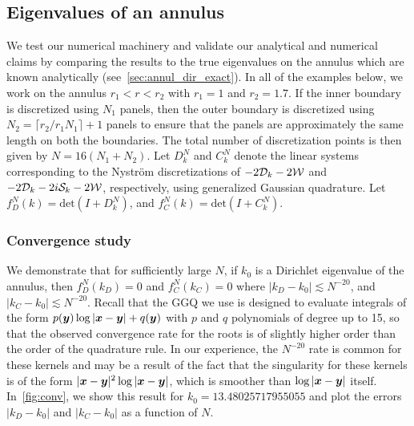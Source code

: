 \subsection{Eigenvalues of an annulus}
We test our numerical machinery and validate our analytical 
and numerical claims
by comparing the results to the true eigenvalues on the annulus
which are known analytically (see~\cref{sec:annul_dir_exact}).
In all of the examples below, we work on the annulus $r_{1}<r<r_{2}$
with $r_{1} = 1$ and $r_{2} = 1.7$.
If the inner boundary is discretized using $N_{1}$ panels, 
then the outer boundary is discretized using $N_{2} = 
\lceil r_{2}/r_{1} N_{1} \rceil +1$ panels to ensure that the
panels are approximately the same length on both the boundaries. 
The total number of discretization points 
is then given by $N = 16(N_{1} + N_{2})$.
{\color{red}Let $D^{N}_{k}$ and $C^{N}_{k}$ denote the linear
  systems corresponding to the Nystr\"{o}m discretizations of
  $-2{\mathcal D}_{k} -2{\mathcal W}$ and $-2{\mathcal D}_{k} - 2i{\mathcal S}_{k} -2{\mathcal W}$,
  respectively, using generalized Gaussian quadrature.}
Let $f_{D}^{N}(k) = \text{det}(I+D^{N}_{k})$, and 
$f_{C}^{N}(k) = \text{det}(I+C^{N}_{k})$.

\subsubsection{Convergence study}
\label{subsec:convannulus}
We demonstrate that 
for sufficiently large $N$, if $k_{0}$ is a Dirichlet 
eigenvalue of the annulus, 
then $f_{D}^{N}(k_{D}) = 0$ and $f_{C}^{N}(k_{C}) = 0$
where $|k_{D} - k_{0}| \lesssim N^{-20}$, 
and $|k_{C} - k_{0}| \lesssim N^{-20}$.
Recall that the GGQ we use {\color{red} is designed to
evaluate integrals of the form $p({\boldsymbol y})\log|{\boldsymbol x}-{\boldsymbol y}|
+ q({\boldsymbol y})$ with $p$ and $q$ polynomials of degree up
to 15, so that the observed convergence rate
for the roots is of slightly higher order than the
order of the quadrature rule. In our experience, the $N^{-20}$
rate is common for these kernels and may be a result of the
fact that the singularity for these kernels is of the form
$|{\boldsymbol x}-{\boldsymbol y}|^2\log|{\boldsymbol x}-{\boldsymbol y}|$, which is smoother than
$\log|{\boldsymbol x}-{\boldsymbol y}|$ itself.}
In~\cref{fig:conv}, we show this result for $k_{0} = 13.48025717955055$
and plot the errors $|k_{D}-k_{0}|$ and $|k_{C}-k_{0}|$ as a function
of $N$. 

